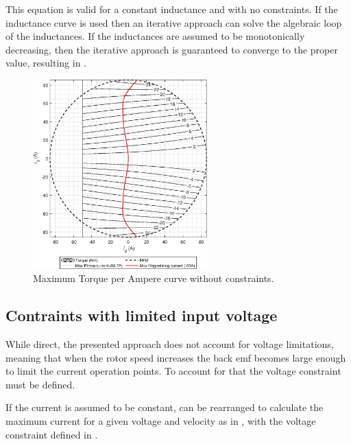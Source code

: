 This equation is valid for a constant inductance and with no constraints. If the inductance curve is used then an iterative approach can solve the algebraic loop of the inductances. If the inductances are assumed to be monotonically decreasing, then the iterative approach is guaranteed to converge to the proper value, resulting in .

\begin{figure}[!htb]
	\centering
	\includegraphics[width=0.6\textwidth]{Figures/Torque_MTPA_simple.eps}
	\caption[Maximum Torque per Ampere curve without constraints.]{Maximum Torque per Ampere curve without constraints.}
	\label{fig:mtpa_simple} %
\end{figure}

\subsection{Contraints with limited input voltage}

While direct, the presented approach does not account for voltage limitations, meaning that when the rotor speed increases the back emf becomes large enough to limit the current operation points. To account for that the voltage constraint must be defined.

If the current is assumed to be constant,  can be rearranged to calculate the maximum current for a given voltage and velocity as in , with the voltage constraint defined in .

